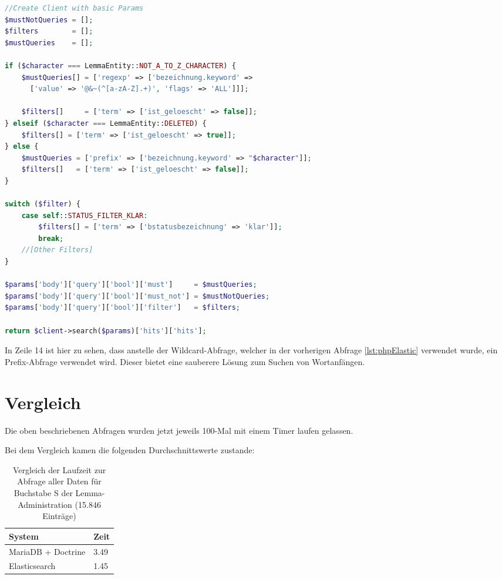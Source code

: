 \begin{lstlisting}[language=PHP, frame=single, label={lst:queryEla}] 
//Create Client with basic Params
$mustNotQueries = [];
$filters        = [];
$mustQueries    = [];

if ($character === LemmaEntity::NOT_A_TO_Z_CHARACTER) {
    $mustQueries[] = ['regexp' => ['bezeichnung.keyword' => 
      ['value' => '@&~(^[a-zA-Z].+)', 'flags' => 'ALL']]];
      
    $filters[]     = ['term' => ['ist_geloescht' => false]];
} elseif ($character === LemmaEntity::DELETED) {
    $filters[] = ['term' => ['ist_geloescht' => true]];
} else {
    $mustQueries = ['prefix' => ['bezeichnung.keyword' => "$character"]];
    $filters[]   = ['term' => ['ist_geloescht' => false]];
}

switch ($filter) {
    case self::STATUS_FILTER_KLAR:
        $filters[] = ['term' => ['bstatusbezeichnung' => 'klar']];
        break;
    //[Other Filters]
}

$params['body']['query']['bool']['must']     = $mustQueries;
$params['body']['query']['bool']['must_not'] = $mustNotQueries;
$params['body']['query']['bool']['filter']   = $filters;

return $client->search($params)['hits']['hits'];
\end{lstlisting}

In Zeile 14 ist hier zu sehen, dass anstelle der Wildcard-Abfrage, welcher in der vorherigen Abfrage \ref{lst:phpElastic} verwendet wurde, ein Prefix-Abfrage verwendet wird. Dieser bietet eine sauberere Lösung zum Suchen von Wortanfängen.

\section{Vergleich}

Die oben beschriebenen Abfragen wurden jetzt jeweils 100-Mal mit einem Timer laufen gelassen. 

Bei dem Vergleich kamen die folgenden Durchschnittswerte zustande:
\begin{table} %
	\centering
		\begin{tabular}{l | l }
		    \textbf{System} & \textbf{Zeit} \\
        \hline
        MariaDB + Doctrine & 3.49 \\
        Elasticsearch      & 1.45  \\
		\end{tabular}
    \caption{Vergleich der Laufzeit zur Abfrage aller Daten für Buchstabe S der Lemma-Administration (15.846 Einträge)}
    \label{vlgTimeDBvsEla}
\end{table}

